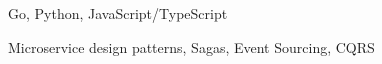 \item Go, Python, JavaScript/TypeScript
\item Microservice design patterns, Sagas, Event Sourcing, CQRS
